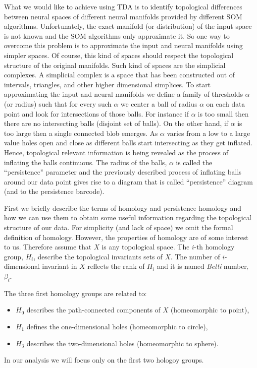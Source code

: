 \documentclass[10pt]{article}
\theoremstyle{definition}
\begin{document}
What we would like to achieve using TDA is to identify topological differences 
between neural spaces of different neural manifolds provided by different
SOM algorithms. Unfortunately, the exact manifold (or distribution) of the
input space is not known and the SOM algorithms only approximate it. So one 
way to overcome this problem is to approximate the input and neural manifolds
using simpler spaces. Of course, this kind of spaces should respect the
topological structure of the original manifolds. Such kind of spaces are the
simplicial complexes. A simplicial complex is a space that has been constructed
out of intervals, triangles, and other higher dimensional simplices. To start
approximating the input and neural manifolds we define a family of thresholds
$\alpha$ (or radius) such that for every such $\alpha$ we center a ball of
radius $\alpha$ on each data point and look for intersections of those balls.
For instance if $\alpha$ is too small then there are no intersecting balls 
(disjoint set of balls). On the other hand, if $\alpha$ is too large then 
a single connected blob emerges. As $\alpha$ varies from a low to a large 
value holes open and close as different balls start intersecting as they 
get inflated. Hence, topological relevant information is being revealed as 
the process of inflating the balls continuous. The radius of the balls,
$\alpha$ is called the ``persistence'' parameter and the previously described 
process of inflating balls around our data point gives rise to a diagram 
that is called ``persistence'' diagram (and to the persistence barcode). 


First we briefly describe the terms of homology and persistence homology and 
how we can use them to obtain some useful information regarding the topological
structure of our data. For simplicity (and lack of space) we omit the formal
definition of homology. However, the properties of homology are of some
interest to us. Therefore assume that $X$ is any topological space. The $i$-th
homology group, $H_i$, describe the topological invariants sets of $X$. The 
number of $i$-dimensional invariant in $X$ reflects the rank of $H_i$ and
it is named \emph{Betti} number, $\beta_i$.

The
three first homology groups are related to:
\begin{itemize}
    \item $H_0$ describes the path-connected components of $X$ (homeomorphic to
        point),
    \item $H_1$ defines the one-dimensional holes (homeomorphic to circle),
    \item $H_3$ describes the two-dimensional holes (homeomorphic to sphere).
\end{itemize}
In our analysis we will focus only on the first two hologoy groups. 
\end{document}
